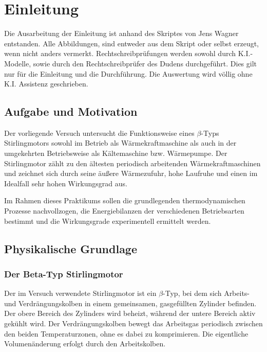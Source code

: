 \chapter{Einleitung} \label{ch:Einleitung}

Die Ausarbeitung der Einleitung ist anhand des Skriptes von Jens Wagner entstanden. Alle Abbildungen, sind entweder aus dem Skript oder selbst erzeugt, wenn nicht anders vermerkt. Rechtschreibprüfungen werden sowohl durch K.I.-Modelle, sowie durch den Rechtschreibprüfer des Dudens durchgeführt.  Dies gilt nur für die Einleitung und die Durchführung. Die Auswertung wird völlig ohne K.I. Assistenz geschrieben. \cite{skriptPAP21, Duden}


\section{Aufgabe und Motivation} \label{sec:AuM}

Der vorliegende Versuch untersucht die Funktionsweise eines \(\beta\)-Typs Stirlingmotors sowohl im Betrieb als Wärmekraftmaschine als auch in der umgekehrten Betriebsweise als Kältemaschine bzw. Wärmepumpe. Der Stirlingmotor zählt zu den ältesten periodisch arbeitenden Wärmekraftmaschinen und zeichnet sich durch seine äußere Wärmezufuhr, hohe Laufruhe und einen im Idealfall sehr hohen Wirkungsgrad aus. 

Im Rahmen dieses Praktikums sollen die grundlegenden thermodynamischen Prozesse nachvollzogen, die Energiebilanzen der verschiedenen Betriebsarten bestimmt und die Wirkungsgrade experimentell ermittelt werden.

\section{Physikalische Grundlage} \label{sec:PhyBasics}

\subsection{Der Beta-Typ Stirlingmotor} \label{ssec:bTS}

Der im Versuch verwendete Stirlingmotor ist ein \(\beta\)-Typ, bei dem sich Arbeits- und Verdrängungskolben in einem gemeinsamen, gasgefüllten Zylinder befinden. Der obere Bereich des Zylinders wird beheizt, während der untere Bereich aktiv gekühlt wird. Der Verdrängungskolben bewegt das Arbeitsgas periodisch zwischen den beiden Temperaturzonen, ohne es dabei zu komprimieren. Die eigentliche Volumenänderung erfolgt durch den Arbeitskolben.

